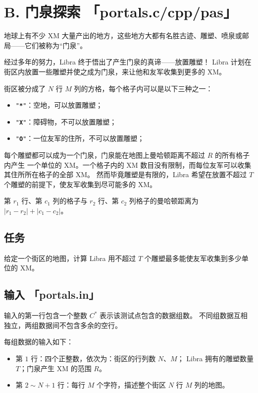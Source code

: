 \documentclass[UTF8, 11pt, a4paper]{article}
\begin{document}

\section*{B. \makebox[1em]{} 门泉探索 \makebox[2.5em]{} \small{「portals.c/cpp/pas」}}
地球上有不少 XM 大量产出的地方，这些地方大都有名胜古迹、雕塑、喷泉或邮局——它们被称为“门泉”。

经过多年的努力，Libra 终于悟出了产生门泉的真谛——放置雕塑！%
Libra 计划在街区内放置一些雕塑并使之成为门泉，来让他和友军收集到更多的 XM。

街区被分成了 $N$ 行 $M$ 列的方格，每个格子内可以是以下三种之一：
\begin{itemize}
    \item \texttt{"\textbf{*}"}：空地，可以放置雕塑；
    \item \texttt{"\textbf{X}"}：障碍物，不可以放置雕塑；
    \item \texttt{"\textbf{O}"}：一位友军的住所，不可以放置雕塑；
\end{itemize}

每个雕塑都可以成为一个门泉，门泉能在地图上曼哈顿距离不超过 $R$ 的所有格子内产生%
一个单位的 XM。一个格子内的 XM 数目没有限制，而每位友军可以收集其住所所在格子的全部 XM。%
然而毕竟雕塑是有限的，Libra 希望在放置不超过 $T$ 个雕塑的前提下，使友军收集到尽可能多的 XM。

第 $r_1$ 行、第 $c_1$ 列的格子与 $r_2$ 行、第 $c_2$ 列格子的曼哈顿距离为%
$|r_1 - r_2| + |c_1 - c_2|$。

\subsection*{任务}
给定一个街区的地图，计算 Libra 用不超过 $T$ 个雕塑最多能使友军收集到多少单位的 XM。

\subsection*{输入 \makebox[0.5em]{} \small{「portals.in」}}
输入的第一行包含一个整数 $C^*$ 表示该测试点包含的数据组数。%
不同组数据互相独立，两组数据间不包含多余的空行。

每组数据的输入如下：
\begin{itemize}
    \item 第 $1$ 行：四个正整数，依次为：街区的行列数 $N$、$M$；
        Libra 拥有的雕塑数量 $T$；门泉产生 XM 的范围 $R$。
    \item 第 $2 \sim N+1$ 行：每行 $M$ 个字符，描述整个街区 $N$ 行 $M$ 列的地图。
\end{itemize}
\end{document}
